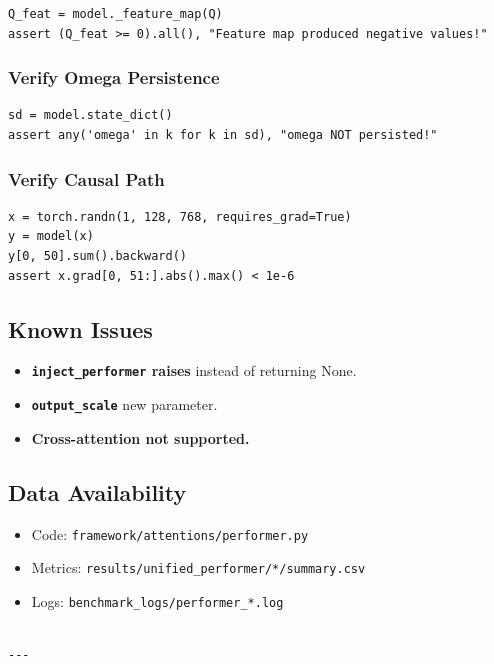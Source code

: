 \begin{lstlisting}
Q_feat = model._feature_map(Q)
assert (Q_feat >= 0).all(), "Feature map produced negative values!"
\end{lstlisting}

\subsubsection{Verify Omega Persistence}

\begin{lstlisting}
sd = model.state_dict()
assert any('omega' in k for k in sd), "omega NOT persisted!"
\end{lstlisting}

\subsubsection{Verify Causal Path}

\begin{lstlisting}
x = torch.randn(1, 128, 768, requires_grad=True)
y = model(x)
y[0, 50].sum().backward()
assert x.grad[0, 51:].abs().max() < 1e-6
\end{lstlisting}

\subsection{Known Issues}

\begin{itemize}
\item \textbf{\texttt{inject\_performer} raises} instead of returning None.
\item \textbf{\texttt{output\_scale}} new parameter.
\item \textbf{Cross-attention not supported.}

\end{itemize}
\subsection{Data Availability}

\begin{itemize}
\item Code: \texttt{framework/attentions/performer.py}
\item Metrics: \texttt{results/unified\_performer/*/summary.csv}
\item Logs: \texttt{benchmark\_logs/performer\_*.log}
\end{itemize}
\begin{lstlisting}

---
\end{lstlisting}